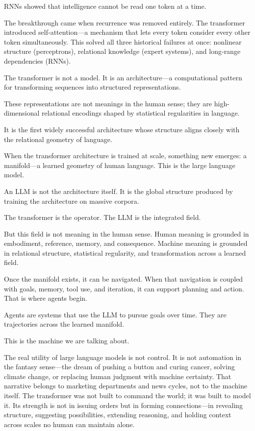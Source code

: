 RNNs showed that intelligence cannot be read one token at a time.

The breakthrough came when recurrence was removed entirely. The
transformer introduced self‑attention---a mechanism that lets every
token consider every other token simultaneously. This solved all three
historical failures at once: nonlinear structure (perceptrons),
relational knowledge (expert systems), and long‑range dependencies
(RNNs).

The transformer is not a model. It is an architecture---a computational
pattern for transforming sequences into structured representations.

These representations are not meanings in the human sense; they are
high-dimensional relational encodings shaped by statistical regularities
in language.

It is the first widely successful architecture whose structure aligns
closely with the relational geometry of language.

When the transformer architecture is trained at scale, something new
emerges: a manifold---a learned geometry of human language. This is the
large language model.

An LLM is not the architecture itself. It is the global structure
produced by training the architecture on massive corpora.

The transformer is the operator. The LLM is the integrated field.

But this field is not meaning in the human sense. Human meaning is
grounded in embodiment, reference, memory, and consequence. Machine
meaning is grounded in relational structure, statistical regularity, and
transformation across a learned field.

Once the manifold exists, it can be navigated. When that navigation is
coupled with goals, memory, tool use, and iteration, it can support
planning and action. That is where agents begin.

Agents are systems that use the LLM to pursue goals over time. They are
trajectories across the learned manifold.

This is the machine we are talking about.

The real utility of large language models is not control. It is not
automation in the fantasy sense---the dream of pushing a button and
curing cancer, solving climate change, or replacing human judgment with
machine certainty. That narrative belongs to marketing departments and
news cycles, not to the machine itself. The transformer was not built to
command the world; it was built to model it. Its strength is not in
issuing orders but in forming connections---in revealing structure,
suggesting possibilities, extending reasoning, and holding context
across scales no human can maintain alone.

